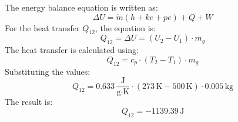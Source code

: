 The energy balance equation is written as:  
\[
\Delta U = \dot{m} \left( h + ke + pe \right) + Q + W
\]  
For the heat transfer \( Q_{12} \), the equation is:  
\[
Q_{12} = \Delta U = (U_2 - U_1) \cdot m_g
\]  
The heat transfer is calculated using:  
\[
Q_{12} = c_p \cdot (T_2 - T_1) \cdot m_g
\]  
Substituting the values:  
\[
Q_{12} = 0.633 \, \frac{\text{J}}{\text{g·K}} \cdot (273 \, \text{K} - 500 \, \text{K}) \cdot 0.005 \, \text{kg}
\]  
The result is:  
\[
Q_{12} = -1139.39 \, \text{J}
\]
